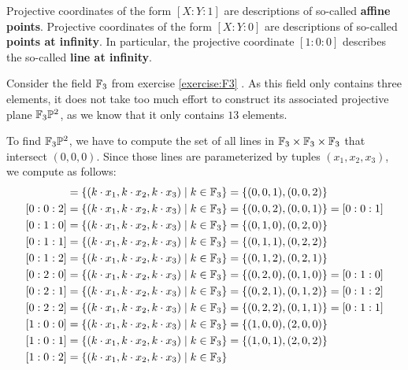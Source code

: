 \begin{notation}
Projective coordinates of the form $[X:Y:1]$ are descriptions of so-called \textbf{affine points}.  Projective coordinates of the form $[X:Y:0]$ are descriptions of so-called \textbf{points at infinity}. In particular, the projective coordinate $[1:0:0]$ describes the so-called \textbf{line at infinity}.
\end{notation}
\begin{example} Consider the field $\mathbb{F}_3$ from exercise \ref{exercise:F3} . As this field only contains three elements, it does not take too much effort to construct its associated projective plane $\mathbb{F}_3\mathbb{P}^2$, as we know that it only contains $13$ elements.

To find $\mathbb{F}_3\mathbb{P}^2$, we have to compute the set of all lines in $\mathbb{F}_3\times \mathbb{F}_3\times \mathbb{F}_3$ that intersect $(0,0,0)$. Since those lines are parameterized by tuples $(x_1,x_2,x_3)$, we compute as follows:
\begin{align*}
[0:0:1] &= \{(k\cdot x_1,k\cdot x_2, k\cdot x_3)\;|\; k\in\F_3\}
          = \{(0,0,1), (0,0,2)\}\\
[0:0:2] &= \{(k\cdot x_1,k\cdot x_2, k\cdot x_3)\;|\; k\in\F_3\}
          = \{(0,0,2), (0,0,1)\}
          = [0:0:1]\\
[0:1:0] &= \{(k\cdot x_1,k\cdot x_2, k\cdot x_3)\;|\; k\in\F_3\}
          = \{(0,1,0), (0,2,0)\}\\
[0:1:1] &= \{(k\cdot x_1,k\cdot x_2, k\cdot x_3)\;|\; k\in\F_3\}
          = \{(0,1,1), (0,2,2)\}\\
[0:1:2] &= \{(k\cdot x_1,k\cdot x_2, k\cdot x_3)\;|\; k\in\F_3\}
          = \{(0,1,2), (0,2,1)\}\\
[0:2:0] &= \{(k\cdot x_1,k\cdot x_2, k\cdot x_3)\;|\; k\in\F_3\}
          = \{(0,2,0), (0,1,0)\}
          = [0:1:0]\\
[0:2:1] &= \{(k\cdot x_1,k\cdot x_2, k\cdot x_3)\;|\; k\in\F_3\}
          = \{(0,2,1), (0,1,2)\}
          = [0:1:2]\\
[0:2:2] &= \{(k\cdot x_1,k\cdot x_2, k\cdot x_3)\;|\; k\in\F_3\}
          = \{(0,2,2), (0,1,1)\}
          = [0:1:1]\\
[1:0:0] &= \{(k\cdot x_1,k\cdot x_2, k\cdot x_3)\;|\; k\in\F_3\}
          = \{(1,0,0), (2,0,0)\}\\
[1:0:1] &= \{(k\cdot x_1,k\cdot x_2, k\cdot x_3)\;|\; k\in\F_3\}
          = \{(1,0,1), (2,0,2)\}\\
[1:0:2] &= \{(k\cdot x_1,k\cdot x_2, k\cdot x_3)\;|\; k\in\F_3\}

\end{align*}
\end{example}

